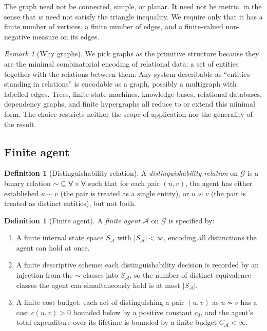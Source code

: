 \documentclass[11pt,a4paper]{article}
\theoremstyle{thmstyle}
\theoremstyle{definition}
\newtheorem{definition}[theorem]{Definition}
\theoremstyle{remark}
\newtheorem{remark}[theorem]{Remark}
\newcommand{\Graph}{\mathcal{G}}
\newcommand{\Vrt}{\mathsf{V}}
\newcommand{\Agent}{\mathcal{A}}
\begin{document}
The graph need not be connected, simple, or planar. It need not be
metric, in the sense that $w$ need not satisfy the triangle
inequality. We require only that it has a finite number of
vertices, a finite number of edges, and a finite-valued non-negative
measure on its edges.

\begin{remark}[Why graphs]
\label{rem:why_graphs}
We pick graphs as the primitive structure because they are the
minimal combinatorial encoding of relational data: a set of entities
together with the relations between them. Any system describable as
``entities standing in relations'' is encodable as a graph, possibly
a multigraph with labelled edges. Trees, finite-state machines,
knowledge bases, relational databases, dependency graphs, and finite
hypergraphs all reduce to or extend this minimal form. The choice
restricts neither the scope of application nor the generality of the
result.
\end{remark}

\subsection{Finite agent}

\begin{definition}[Distinguishability relation]
\label{def:distrel}
A \emph{distinguishability relation} on $\Graph$ is a binary
relation $\sim \subseteq \Vrt \times \Vrt$ such that for each pair
$(u, v)$, the agent has either established $u \sim v$ (the pair is
treated as a single entity), or $u \not\sim v$ (the pair is treated
as distinct entities), but not both.
\end{definition}

\begin{definition}[Finite agent]
\label{def:agent}
A \emph{finite agent} $\Agent$ on $\Graph$ is specified by:
\begin{enumerate}[label=(F\arabic*),leftmargin=2.6em,nosep]
\item\label{F:fin_state} A finite internal state space $S_\Agent$
with $|S_\Agent| < \infty$, encoding all distinctions the agent can
hold at once.
\item\label{F:fin_descr} A finite descriptive scheme: each
distinguishability decision is recorded by an injection from the
$\sim$-classes into $S_\Agent$, so the number of distinct
equivalence classes the agent can simultaneously hold is at most
$|S_\Agent|$.
\item\label{F:fin_cost} A finite cost budget: each act of
distinguishing a pair $(u,v)$ as $u \not\sim v$ has a cost
$c(u,v) > 0$ bounded below by a positive constant $c_0$, and the
agent's total expenditure over its lifetime is bounded by a finite
budget $C_{\Agent} < \infty$.
\end{enumerate}
\end{definition}
\end{document}
